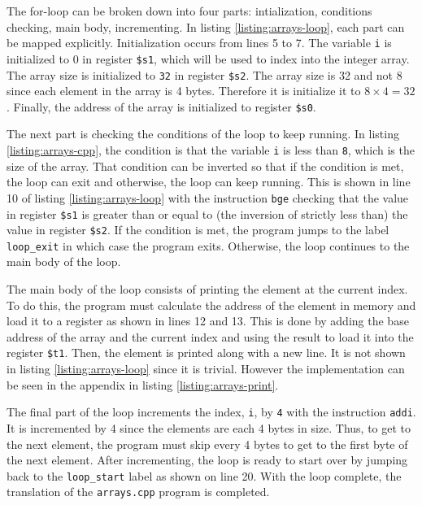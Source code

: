 \documentclass[11pt]{report}
\begin{document}
\newpage

The for-loop can be broken down into four parts: intialization, conditions checking, main body,
incrementing. In listing \ref{listing:arrays-loop}, each part can be mapped explicitly.
Initialization occurs from lines 5 to 7. The variable \verb|i| is initialized to 0 in register
\verb|$s1|, which will be used to index into the integer array. The array size is initialized to
\verb|32| in register \verb|$s2|. The array size is 32 and not 8 since each element in the array is
4 bytes. Therefore it is initialize it to $8 \times 4 = 32$. Finally, the address of the array is
initialized to register \verb|$s0|.

The next part is checking the conditions of the loop to keep running. In listing
\ref{listing:arrays-cpp}, the condition is that the variable \verb|i| is less than \verb|8|, which
is the size of the array. That condition can be inverted so that if the condition is met, the loop
can exit and otherwise, the loop can keep running. This is shown in line 10 of listing
\ref{listing:arrays-loop} with the instruction \verb|bge| checking that the value in register
\verb|$s1| is greater than or equal to (the inversion of strictly less than) the value in register
\verb|$s2|. If the condition is met, the program jumps to the label \verb|loop_exit| in which case
the program exits. Otherwise, the loop continues to the main body of the loop.

The main body of the loop consists of printing the element at the current index. To do this, the
program must calculate the address of the element in memory and load it to a register as shown in
lines 12 and 13. This is done by adding the base address of the array and the current index and
using the result to load it into the register \verb|$t1|. Then, the element is printed along with a
new line. It is not shown in listing \ref{listing:arrays-loop} since it is trivial. However the
implementation can be seen in the appendix in listing \ref{listing:arrays-print}.

The final part of the loop increments the index, \verb|i|, by \verb|4| with the instruction
\verb|addi|. It is incremented by 4 since the elements are each 4 bytes in size. Thus, to get to the
next element, the program must skip every 4 bytes to get to the first byte of the next element.
After incrementing, the loop is ready to start over by jumping back to the \verb|loop_start| label
as shown on line 20. With the loop complete, the translation of the \verb|arrays.cpp| program is
completed.
\end{document}
